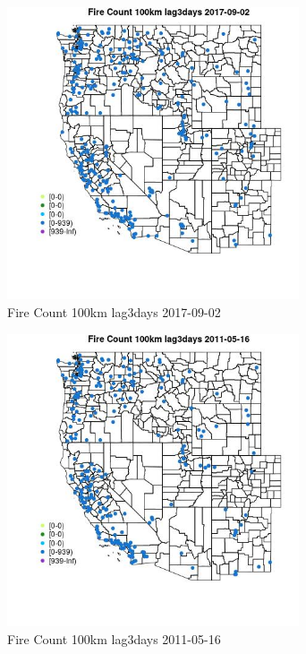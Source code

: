 \begin{figure} 
\centering  
\includegraphics[width=0.77\textwidth]{Code_Outputs/Report_ML_input_PM25_Step4_part_e_de_duplicated_aves_compiled_2019-05-21wNAs_MapObsFire_Count_100km_lag3days2017-09-02.jpg} 
\caption{\label{fig:Report_ML_input_PM25_Step4_part_e_de_duplicated_aves_compiled_2019-05-21wNAsMapObsFire_Count_100km_lag3days2017-09-02}Fire Count 100km lag3days 2017-09-02} 
\end{figure} 
 

\begin{figure} 
\centering  
\includegraphics[width=0.77\textwidth]{Code_Outputs/Report_ML_input_PM25_Step4_part_e_de_duplicated_aves_compiled_2019-05-21wNAs_MapObsFire_Count_100km_lag3days2011-05-16.jpg} 
\caption{\label{fig:Report_ML_input_PM25_Step4_part_e_de_duplicated_aves_compiled_2019-05-21wNAsMapObsFire_Count_100km_lag3days2011-05-16}Fire Count 100km lag3days 2011-05-16} 
\end{figure} 
 

